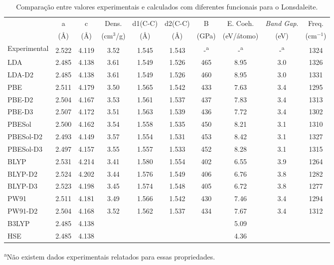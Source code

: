  		\begin{table}[!h]
 			\centering
 			\caption{Comparação entre valores experimentais e calculados com diferentes funcionais para o Lonsdaleite.}
 			\label{lonsdaleite}
 			\renewcommand{\arraystretch}{1.1}
 			\tiny\selectfont
 			\begin{tabular}{l|ccccccccc}
 				\hline\hline
 				& a     & c     & Dens. & d1(C-C) & d2(C-C) & B & E. Coeh. & \textit{Band Gap}. & Freq. \\
 				& (\AA{}) & (\AA{}) & (cm$^3$/g) & (\AA{}) & (\AA{}) & (GPa) & (eV/átomo) & (eV) & (cm$^{-1}$)\\ \hline
 				Experimental  & 2.522 \textsuperscript{\cite{bundy1967hexagonal}} & 4.119\textsuperscript{\cite{bundy1967hexagonal}} & 3.52\textsuperscript{\cite{bundy1967hexagonal}} & 1.545\textsuperscript{\cite{bundy1967hexagonal}} & 1.543\textsuperscript{\cite{bundy1967hexagonal}} &  -\textsuperscript{a}  & -\textsuperscript{a}     &  -\textsuperscript{a}  & 1324\textsuperscript{\cite{misra2006hexagonal}} \\
 				LDA           & 2.485 & 4.138 & 3.61 & 1.549 & 1.526 & 465 &  8.95  & 3.0 & 1326 \\
 				LDA-D2        & 2.485 & 4.138 & 3.61 & 1.549 & 1.526 & 460 &  8.95  & 3.0 & 1331 \\
 				PBE       & 2.511 & 4.179 & 3.50 & 1.565 & 1.542 & 433 &  7.63  & 3.4 & 1295 \\
 				PBE-D2    & 2.504 & 4.167 & 3.53 & 1.561 & 1.537 & 437 &  7.83  & 3.4 & 1313 \\
 				PBE-D3    & 2.507 & 4.172 & 3.51 & 1.563 & 1.539 & 436 &  7.72  & 3.4 & 1302 \\
 				PBESol    & 2.500 & 4.162 & 3.54 & 1.558 & 1.535 & 450 &  8.21  & 3.1 & 1310 \\
 				PBESol-D2 & 2.493 & 4.149 & 3.57 & 1.554 & 1.531 & 453 &  8.42  & 3.1 & 1327 \\
 				PBESol-D3 & 2.497 & 4.157 & 3.55 & 1.557 & 1.533 & 452 &  8.28  & 3.1 & 1315 \\
 				BLYP      & 2.531 & 4.214 & 3.41 & 1.580 & 1.554 & 402 &  6.55  & 3.9 & 1264 \\
 				BLYP-D2   & 2.524 & 4.202 & 3.44 & 1.576 & 1.549 & 406 &  6.76  & 3.8 & 1282 \\
 				BLYP-D3   & 2.523 & 4.198 & 3.45 & 1.574 & 1.548 & 405 &  6.72  & 3.8 & 1277 \\
 				PW91      & 2.511 & 4.181 & 3.49 & 1.566 & 1.542 & 430 &  7.46  & 3.4 & 1294 \\
 				PW91-D2   & 2.504 & 4.168 & 3.52 & 1.562 & 1.537 & 434 &  7.67  & 3.4 & 1312 \\
 				B3LYP         & 2.485 & 4.138 &      &       &       &     &  5.09  &     &      \\
 				HSE           & 2.485 & 4.138 &      &       &       &     &  4.36  &     &      \\ \hline\hline           
 			\end{tabular}
 		\begin{flushleft}
 			\textsuperscript{a}Não existem dados experimentais relatados para essas propriedades.
 		\end{flushleft}
 		\end{table}
 	

